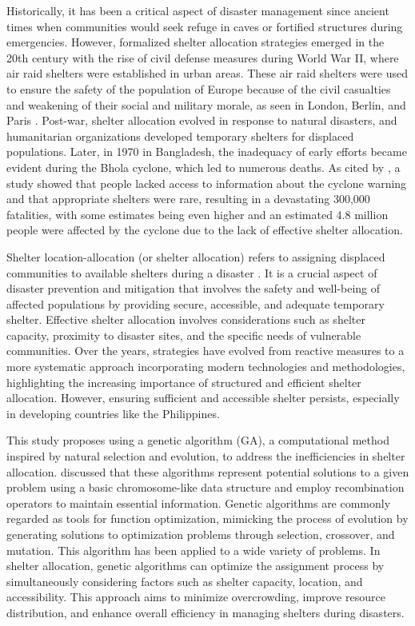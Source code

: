 Historically, it has been a critical aspect of disaster management since ancient times when communities would seek refuge in caves or fortified structures during emergencies. However, formalized shelter allocation strategies emerged in the 20th century with the rise of civil defense measures during World War II, where air raid shelters were established in urban areas. These air raid shelters were used to ensure the safety of the population of Europe because of the civil casualties and weakening of their social and military morale, as seen in London, Berlin, and Paris \parencite{Flebus1941,Shakibamaesh2015}. Post-war, shelter allocation evolved in response to natural disasters, and humanitarian organizations developed temporary shelters for displaced populations. Later, in 1970 in Bangladesh, the inadequacy of early efforts became evident during the Bhola cyclone, which led to numerous deaths. As cited by \textcite{Hossain2018}, a study showed that people lacked access to information about the cyclone warning and that appropriate shelters were rare, resulting in a devastating 300,000 fatalities, with some estimates being even higher and an estimated 4.8 million people were affected by the cyclone due to the lack of effective shelter allocation.

Shelter location-allocation (or shelter allocation) refers to assigning displaced communities to available shelters during a disaster \parencite{Yin2023}. It is a crucial aspect of disaster prevention and mitigation that involves the safety and well-being of affected populations by providing secure, accessible, and adequate temporary shelter. Effective shelter allocation involves considerations such as shelter capacity, proximity to disaster sites, and the specific needs of vulnerable communities. Over the years, strategies have evolved from reactive measures to a more systematic approach incorporating modern technologies and methodologies, highlighting the increasing importance of structured and efficient shelter allocation. However, ensuring sufficient and accessible shelter persists, especially in developing countries like the Philippines.

This study proposes using a genetic algorithm (GA), a computational method inspired by natural selection and evolution, to address the inefficiencies in shelter allocation. \textcite{Mathew2012} discussed that these algorithms represent potential solutions to a given problem using a basic chromosome-like data structure and employ recombination operators to maintain essential information. Genetic algorithms are commonly regarded as tools for function optimization, mimicking the process of evolution by generating solutions to optimization problems through selection, crossover, and mutation. This algorithm has been applied to a wide variety of problems. In shelter allocation, genetic algorithms can optimize the assignment process by simultaneously considering factors such as shelter capacity, location, and accessibility. This approach aims to minimize overcrowding, improve resource distribution, and enhance overall efficiency in managing shelters during disasters.

